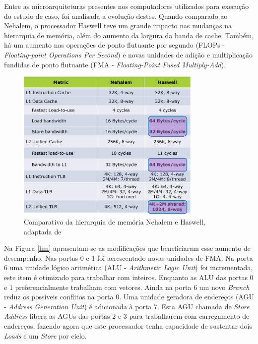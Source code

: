 \documentclass[conference]{IEEEtran}
\begin{document}
        
        Entre as microarquiteturas presentes nos computadores utilizados para execução do estudo de caso, foi analisada a evolução destes. Quando comparado ao Nehalem, o processador Haswell teve um grande impacto nas mudanças na hierarquia de memória, além do aumento da largura da banda de cache. Também, há um aumento nas operações de ponto flutuante por segundo (FLOPs - \textit{Floating-point Operations Per Second}) e novas unidades  de adição e multiplicação fundidas de ponto flutuante (FMA - \textit{Floating-Point Fused Multiply-Add})\cite{jain2013haswell}.
    

        \begin{figure}[ht]
            \centering
            \includegraphics[width=3.5in]{nehalemvshaswell.png}
            \caption{Comparativo da hierarquia de memória Nehalem e Haswell, adaptada de \cite{hammarlund20134th}}
            \label{nhvshaswell}
        \end{figure}
        
        Na Figura \ref{hm} aprasentam-se as modificações que beneficiaram esse aumento de desempenho. Nas portas 0 e 1 foi acrescentado novas unidades de FMA. Na porta 6 uma unidade lógico aritmética (ALU - \textit{Arithmetic Logic Unit}) foi incrementada, este item é otimizado para trabalhar com inteiros. Enquanto as ALU das portas 0 e 1 preferencialmente trabalham com vetores. Ainda na porta 6 um novo \textit{Branch} reduz os possíveis conflitos na porta 0. Uma unidade geradora de endereços (AGU - \textit{Address Generation Unit}) é adicionada à porta 7. Esta AGU chamada de \textit{Store Address} libera as AGUs das portas 2 e 3 para trabalharem com carregamento de endereços, fazendo agora que este processador tenha capacidade de sustentar dois \textit{Loads} e um \textit{Store} por ciclo\cite{hammarlund20134th}.
\end{document}
